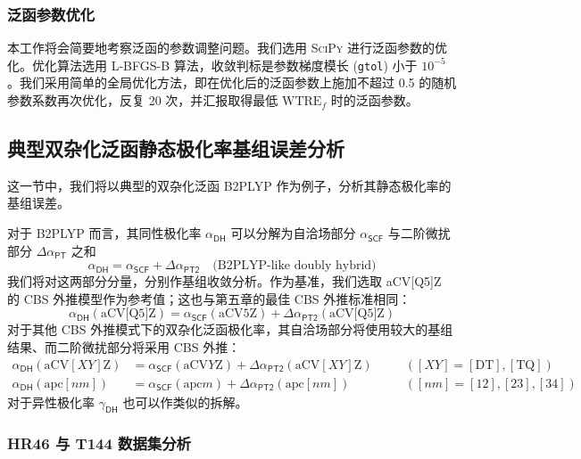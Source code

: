 \subsubsection{泛函参数优化}

本工作将会简要地考察泛函的参数调整问题。我们选用 \textsc{SciPy}\cite{Virtanen-Vazquez-Baeza.NM.2020} 进行泛函参数的优化。优化算法选用 L-BFGS-B 算法\cite{Byrd-Zhu.SJSC.1995}，收敛判标是参数梯度模长 (\verb|gtol|) 小于 $10^{-5}$。我们采用简单的全局优化方法，即在优化后的泛函参数上施加不超过 0.5 的随机参数系数再次优化，反复 20 次，并汇报取得最低 $\mathrm{WTRE}_f$ 时的泛函参数。

\subsection{典型双杂化泛函静态极化率基组误差分析}
\label{sec.6.basis-converg}

这一节中，我们将以典型的双杂化泛函 B2PLYP 作为例子，分析其静态极化率的基组误差。

对于 B2PLYP 而言，其同性极化率 $\alpha_\textsf{DH}$ 可以分解为自洽场部分 $\alpha_\textsf{SCF}$ 与二阶微扰部分 $\Delta \alpha_\textsf{PT}$ 之和
\begin{equation*}
    \alpha_\textsf{DH} = \alpha_\textsf{SCF} + \Delta \alpha_\textsf{PT2} \quad \text{(B2PLYP-like doubly hybrid)}
\end{equation*}
我们将对这两部分分量，分别作基组收敛分析。作为基准，我们选取 aCV[Q5]Z 的 CBS 外推模型作为参考值；这也与第五章的最佳 CBS 外推标准相同：
\begin{equation*}
    \alpha_\textsf{DH} (\text{aCV[Q5]Z}) = \alpha_\textsf{SCF} (\text{aCV5Z}) + \Delta \alpha_\textsf{PT2} (\text{aCV[Q5]Z})
\end{equation*}
对于其他 CBS 外推模式下的双杂化泛函极化率，其自洽场部分将使用较大的基组结果、而二阶微扰部分将采用 CBS 外推：
\begin{align*}
    \alpha_\textsf{DH} (\text{aCV}[XY]\text{Z}) &= \alpha_\textsf{SCF} (\text{aCV}Y\text{Z}) + \Delta \alpha_\textsf{PT2} (\text{aCV}[XY]\text{Z}) \quad &&([XY] = \mathrm{[DT], [TQ]}) \\
    \alpha_\textsf{DH} (\text{apc}[nm]) &= \alpha_\textsf{SCF} (\text{apc}m) + \Delta \alpha_\textsf{PT2} (\text{apc}[nm]) \quad &&([nm] = [12], [23], [34])
\end{align*}
对于异性极化率 $\gamma_\textsf{DH}$ 也可以作类似的拆解。

\subsubsection{HR46 与 T144 数据集分析}

